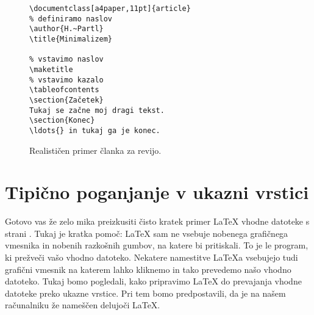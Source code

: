 \begin{figure}[!bp]
\begin{lined}{10cm}
\begin{verbatim}
\documentclass[a4paper,11pt]{article}
% definiramo naslov
\author{H.~Partl}
\title{Minimalizem}

% vstavimo naslov
\maketitle 
% vstavimo kazalo 
\tableofcontents
\section{Začetek}
Tukaj se začne moj dragi tekst.
\section{Konec}
\ldots{} in tukaj ga je konec.

\end{verbatim}
\end{lined}
\caption{Realističen primer članka za revijo.} \label{document}
\end{figure}


\section{Tipično poganjanje v ukazni vrstici}

Gotovo vas že zelo mika preizkusiti čisto kratek primer \LaTeX{} vhodne datoteke
s strani \pageref{mini}. Tukaj je kratka pomoč:
\LaTeX{} sam ne vsebuje nobenega grafičnega vmesnika in nobenih razkošnih gumbov,
na katere bi pritiskali. To je le program, ki prežveči vašo vhodno datoteko. 
Nekatere namestitve \LaTeX{}a vsebujejo tudi grafični vmesnik na katerem lahko 
kliknemo in tako prevedemo našo vhodno datoteko. 
Tukaj bomo pogledali, kako pripravimo \LaTeX{} do prevajanja vhodne datoteke 
preko ukazne vrstice. Pri tem bomo predpostavili, da je na našem računalniku že
nameščen delujoči \LaTeX{}.

